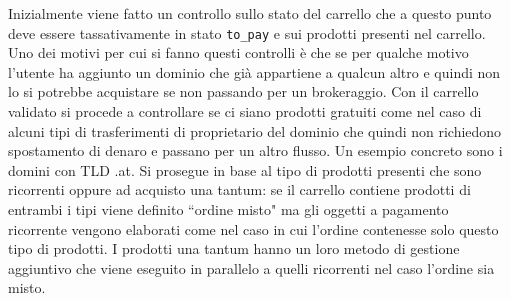 \documentclass[target=bach,aauheader=,style=]{thud}
\begin{document}
Inizialmente viene fatto un controllo sullo stato del carrello che a questo punto deve essere tassativamente in stato \texttt{to\_pay} e sui prodotti presenti nel carrello. Uno dei motivi per cui si
fanno questi controlli è che se per qualche motivo l'utente ha aggiunto un dominio che già appartiene a qualcun altro e quindi non lo si potrebbe acquistare se non passando per un brokeraggio. Con
il carrello validato si procede a controllare se ci siano prodotti gratuiti come nel caso di alcuni tipi di trasferimenti di proprietario del dominio che quindi non richiedono spostamento di denaro e
passano per un altro flusso. Un esempio concreto sono i domini con TLD .at. Si prosegue in base al tipo di prodotti presenti che sono ricorrenti oppure ad acquisto una tantum: se il carrello contiene
prodotti di entrambi i tipi viene definito ``ordine misto" ma gli oggetti a pagamento ricorrente vengono elaborati come nel caso in cui l'ordine contenesse solo questo tipo di prodotti.
I prodotti una tantum hanno un loro metodo di gestione aggiuntivo che viene eseguito in parallelo a quelli ricorrenti nel caso l'ordine sia misto.
\end{document}
